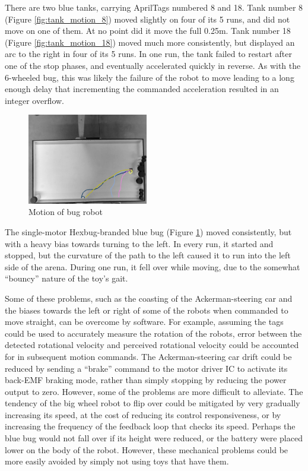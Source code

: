 There are two blue tanks, carrying AprilTags numbered 8 and 18. 
Tank number 8 (Figure \ref{fig:tank_motion_8}) moved slightly on four of its 5 runs, and did not move on one of them. 
At no point did it move the full 0.25m. 
Tank number 18 (Figure \ref{fig:tank_motion_18}) moved much more consistently, but displayed an arc to the right in four of its 5 runs. 
In one run, the tank failed to restart after one of the stop phases, and eventually accelerated quickly in reverse. 
As with the 6-wheeled bug, this was likely the failure of the robot to move leading to a long enough delay that incrementing the commanded acceleration resulted in an integer overflow. 

\begin{figure}[h]
	\centering
	\includegraphics[width=0.47\textwidth]{../hardwareX_paper/robot_5.png}
	\caption{Motion of bug robot}
	\label{fig:bug_robot}
\end{figure}

The single-motor Hexbug-branded blue bug (Figure \ref{fig:bug_robot}) moved consistently, but with a heavy bias towards turning to the left. 
In every run, it started and stopped, but the curvature of the path to the left caused it to run into the left side of the arena. 
During one run, it fell over while moving, due to the somewhat ``bouncy'' nature of the toy's gait.

Some of these problems, such as the coasting of the Ackerman-steering car and the biases towards the left or right of some of the robots when commanded to move straight, can be overcome by software. 
For example, assuming the tags could be used to accurately measure the rotation of the robots, error between the detected rotational velocity and perceived rotational velocity could be accounted for in subsequent motion commands. 
The Ackerman-steering car drift could be reduced by sending a ``brake'' command to the motor driver IC to activate its back-EMF braking mode, rather than simply stopping by reducing the power output to zero. 
However, some of the problems are more difficult to alleviate. 
The tendency of the big wheel robot to flip over could be mitigated by very gradually increasing its speed, at the cost of reducing its control responsiveness, or by increasing the frequency of the feedback loop that checks its speed. 
Perhaps the blue bug would not fall over if its height were reduced, or the battery were placed lower on the body of the robot.
However, these mechanical problems could be more easily avoided by simply not using toys that have them. 


